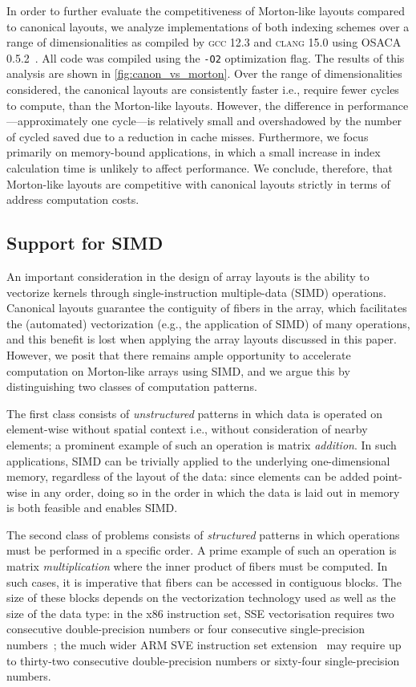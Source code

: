 In order to further evaluate the competitiveness of Morton-like layouts compared to canonical layouts, we analyze implementations of both indexing schemes over a range of dimensionalities as compiled by \textsc{gcc} 12.3 and \textsc{clang} 15.0 using \textsc{OSACA} 0.5.2~\cite{8641578}. All code was compiled using the \texttt{-O2} optimization flag. The results of this analysis are shown in \cref{fig:canon_vs_morton}. Over the range of dimensionalities considered, the canonical layouts are consistently faster i.e., require fewer cycles to compute, than the Morton-like layouts. However, the difference in performance---approximately one cycle---is relatively small and overshadowed by the number of cycled saved due to a reduction in cache misses. Furthermore, we focus primarily on memory-bound applications, in which a small increase in index calculation time is unlikely to affect performance. We conclude, therefore, that Morton-like layouts are competitive with canonical layouts strictly in terms of address computation costs.

\subsection{Support for SIMD}

\label{sec:bijections:SIMD}

An important consideration in the design of array layouts is the ability to vectorize kernels through single-instruction multiple-data (SIMD) operations. Canonical layouts guarantee the contiguity of fibers in the array, which facilitates the (automated) vectorization (e.g., the application of SIMD) of many operations, and this benefit is lost when applying the array layouts discussed in this paper. However, we posit that there remains ample opportunity to accelerate computation on Morton-like arrays using SIMD, and we argue this by distinguishing two classes of computation patterns.

The first class consists of \emph{unstructured} patterns in which data is operated on element-wise without spatial context i.e., without consideration of nearby elements; a prominent example of such an operation is matrix \emph{addition}. In such applications, SIMD can be trivially applied to the underlying one-dimensional memory, regardless of the layout of the data: since elements can be added point-wise in any order, doing so in the order in which the data is laid out in memory is both feasible and enables SIMD.

The second class of problems consists of \emph{structured} patterns in which operations must be performed in a specific order. A prime example of such an operation is matrix \emph{multiplication} where the inner product of fibers must be computed. In such cases, it is imperative that fibers can be accessed in contiguous blocks. The size of these blocks depends on the vectorization technology used as well as the size of the data type: in the x86 instruction set, SSE vectorisation requires two consecutive double-precision numbers or four consecutive single-precision numbers~\cite{intelx86}; the much wider ARM SVE instruction set extension~\cite{7924233} may require up to thirty-two consecutive double-precision numbers or sixty-four single-precision numbers.

